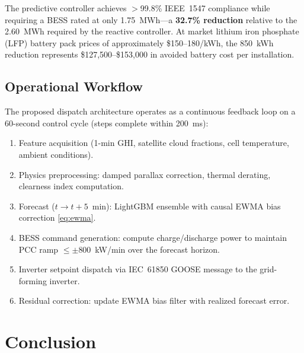\documentclass[conference]{IEEEtran}
\begin{document}
The predictive controller achieves $>$99.8\% IEEE~1547 compliance while
requiring a BESS rated at only 1.75~MWh---a \textbf{32.7\% reduction} relative
to the 2.60~MWh required by the reactive controller. At market lithium iron
phosphate (LFP) battery pack prices of approximately \$150--180/kWh, the
850~kWh reduction represents \$127,500--\$153,000 in avoided battery cost per
installation.

\subsection{Operational Workflow}

The proposed dispatch architecture operates as a continuous feedback loop on a
60-second control cycle (steps complete within 200~ms):
\begin{enumerate}
  \item Feature acquisition (1-min GHI, satellite cloud fractions, cell
        temperature, ambient conditions).
  \item Physics preprocessing: damped parallax correction, thermal derating,
        clearness index computation.
  \item Forecast ($t\!\to\!t{+}5$~min): LightGBM ensemble with causal EWMA
        bias correction \eqref{eq:ewma}.
  \item BESS command generation: compute charge/discharge power to maintain
        PCC ramp $\leq\pm800$~kW/min over the forecast horizon.
  \item Inverter setpoint dispatch via IEC~61850 GOOSE message to the
        grid-forming inverter.
  \item Residual correction: update EWMA bias filter with realized forecast
        error.
\end{enumerate}

\section{Conclusion}
\end{document}

